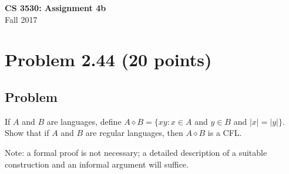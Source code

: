 \documentclass{article}
\begin{document}
\begin{empfile}

\begin{center}
\textbf{\Large CS 3530: Assignment 4b} \\[2mm]
Fall 2017
\end{center}

\raggedright

\section*{Problem 2.44 (20 points)}

\subsection*{Problem}

If $A$ and $B$ are languages, define $A\diamond B=\{xy:x\in A$ and
$y\in B$ and $|x|=|y|\}$. Show that if $A$ and $B$ are regular
languages, then $A\diamond B$ is a CFL.

Note: a formal proof is not necessary; a detailed description of a
suitable construction and an informal argument will suffice.


\end{empfile}
\end{document}
